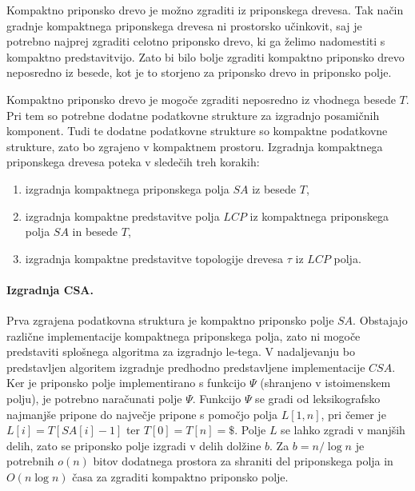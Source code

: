 Kompaktno priponsko drevo je možno zgraditi iz priponskega drevesa. Tak način gradnje kompaktnega priponskega drevesa ni prostorsko učinkovit, saj je potrebno najprej zgraditi celotno priponsko drevo, ki ga želimo nadomestiti s kompaktno predstavitvijo. Zato bi bilo bolje zgraditi kompaktno priponsko drevo neposredno iz besede, kot je to storjeno za priponsko drevo in priponsko polje.

Kompaktno priponsko drevo je mogoče zgraditi neposredno iz vhodnega besede $T$. Pri tem so potrebne dodatne podatkovne strukture za izgradnjo posamičnih komponent. Tudi te dodatne podatkovne strukture so kompaktne podatkovne strukture, zato bo  zgrajeno v kompaktnem prostoru. Izgradnja kompaktnega priponskega drevesa poteka v sledečih treh korakih:
\begin{enumerate}
    \item izgradnja kompaktnega priponskega polja $SA$ iz besede $T$,
    \item izgradnja kompaktne predstavitve polja $LCP$ iz kompaktnega priponskega polja $SA$ in besede $T$,
    \item izgradnja kompaktne predstavitve topologije drevesa $\tau$ iz $LCP$ polja.
\end{enumerate}

\paragraph{Izgradnja CSA.}

Prva zgrajena podatkovna struktura je kompaktno priponsko polje $SA$. Obstajajo različne implementacije kompaktnega priponskega polja, zato ni mogoče predstaviti splošnega algoritma za izgradnjo le-tega. V nadaljevanju bo predstavljen algoritem izgradnje predhodno predstavljene implementacije $CSA$. Ker je priponsko polje implementirano s funkcijo $\Psi$ (shranjeno v istoimenskem polju), je potrebno naračunati polje $\Psi$. 
Funkcijo $\Psi$ se gradi od leksikografsko najmanjše pripone do največje pripone s pomočjo polja $L[1,n]$, pri čemer je $L[i]=T[SA[i]-1]$ ter $T[0]=T[n]=\$$.
Polje $L$ se lahko zgradi v manjših delih, zato se priponsko polje izgradi v delih dolžine $b$. Za $b=n/\log{n}$ je potrebnih $o(n)$ bitov dodatnega prostora za shraniti del priponskega polja in $O(n\log{n})$ časa za zgraditi kompaktno priponsko polje\cite{Navarro2016}.


